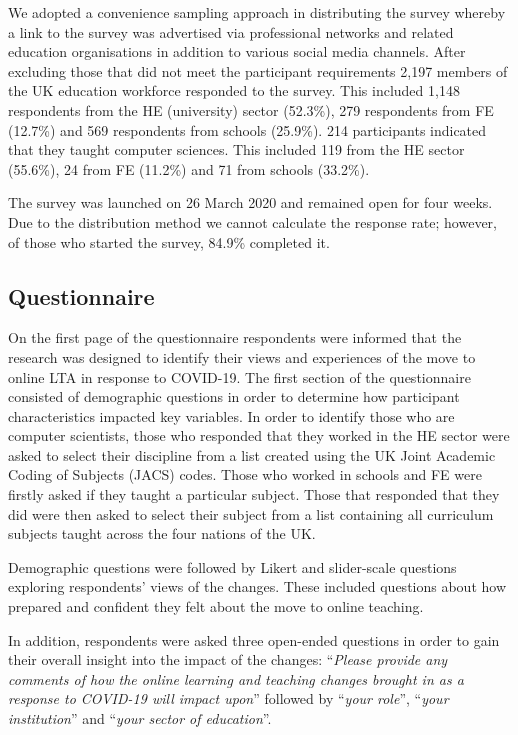 \documentclass[sigconf]{acmart}
\begin{document}
We adopted a convenience sampling approach in distributing the survey
whereby a link to the survey was advertised via professional networks
and related education organisations in addition to various social
media channels. After excluding those that did not meet the
participant requirements 2,197 members of the UK education workforce
responded to the survey. This included 1,148 respondents from the HE
(university) sector (52.3\%), 279 respondents from FE (12.7\%) and 569
respondents from schools (25.9\%). 214 participants indicated that
they taught computer sciences. This included 119 from the HE sector
(55.6\%), 24 from FE (11.2\%) and 71 from schools (33.2\%).

The survey was launched on 26 March 2020 and remained open for four
weeks. Due to the distribution method we cannot calculate the response
rate; however, of those who started the survey, 84.9\% completed it.

\subsection{Questionnaire}

On the first page of the questionnaire respondents were informed that
the research was designed to identify their views and experiences of
the move to online LTA in response to COVID-19. The first section of
the questionnaire consisted of demographic questions in order to
determine how participant characteristics impacted key variables. In
order to identify those who are computer scientists, those who
responded that they worked in the HE sector were asked to select their
discipline from a list created using the UK Joint Academic Coding of
Subjects (JACS) codes. Those who worked in schools and FE were firstly
asked if they taught a particular subject. Those that responded that
they did were then asked to select their subject from a list
containing all curriculum subjects taught across the four nations of
the UK.

Demographic questions were followed by Likert and slider-scale
questions exploring respondents' views of the changes. These included
questions about how prepared and confident they felt about the move to
online teaching.

In addition, respondents were asked three open-ended questions in
order to gain their overall insight into the impact of the changes:
``{\emph{Please provide any comments of how the online learning and
teaching changes brought in as a response to COVID-19 will impact
upon}}'' followed by ``{\emph{your role}}'', ``{\emph{your
institution}}'' and ``{\emph{your sector of education}}''.
\end{document}
